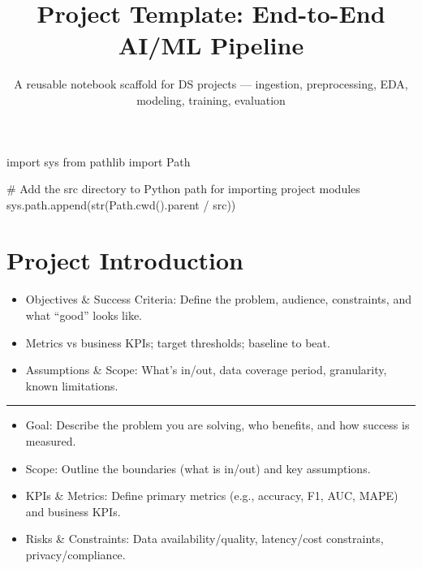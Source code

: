 \documentclass[
  letterpaper,
  DIV=11,
  numbers=noendperiod]{scrartcl}
\title{Project Template: End-to-End AI/ML Pipeline}
\subtitle{A reusable notebook scaffold for DS projects --- ingestion,
preprocessing, EDA, modeling, training, evaluation}
\author{}
\date{}
\newenvironment{Shaded}{\begin{snugshade}}{\end{snugshade}}
\newcommand{\BuiltInTok}[1]{\textcolor[rgb]{0.00,0.23,0.31}{#1}}
\newcommand{\CommentTok}[1]{\textcolor[rgb]{0.37,0.37,0.37}{#1}}
\newcommand{\ImportTok}[1]{\textcolor[rgb]{0.00,0.46,0.62}{#1}}
\newcommand{\NormalTok}[1]{\textcolor[rgb]{0.00,0.23,0.31}{#1}}
\newcommand{\OperatorTok}[1]{\textcolor[rgb]{0.37,0.37,0.37}{#1}}
\newcommand{\StringTok}[1]{\textcolor[rgb]{0.13,0.47,0.30}{#1}}
\providecommand{\tightlist}{%
  \setlength{\itemsep}{0pt}\setlength{\parskip}{0pt}}
\renewenvironment{Shaded}{%
  \begin{tcolorbox}[%
    enhanced,%
    colback=codebg,%
    colframe=codebg,%
    borderline west={3pt}{0pt}{sectionblue},%
    boxrule=0pt,%
    arc=0pt,%
    boxsep=5pt,%
    left=2mm,%
    right=2mm,%
    top=2mm,%
    bottom=2mm%
  ]%
}{%
  \end{tcolorbox}%
}
\renewcommand*\contentsname{Table of contents}
\newcommand\contentsname{Table of contents}
\begin{document}
\maketitle

\renewcommand*\contentsname{Table of contents}
{
\hypersetup{linkcolor=}
\setcounter{tocdepth}{3}
\tableofcontents
}

\begin{Shaded}
\begin{Highlighting}[]
\ImportTok{import}\NormalTok{ sys}
\ImportTok{from}\NormalTok{ pathlib }\ImportTok{import}\NormalTok{ Path}

\CommentTok{\# Add the src directory to Python path for importing project modules}
\NormalTok{sys.path.append(}\BuiltInTok{str}\NormalTok{(Path.cwd().parent }\OperatorTok{/} \StringTok{\textquotesingle{}src\textquotesingle{}}\NormalTok{))}
\end{Highlighting}
\end{Shaded}

\section{Project Introduction}\label{project-introduction}

\begin{itemize}
\tightlist
\item
  Objectives \& Success Criteria: Define the problem, audience,
  constraints, and what ``good'' looks like.
\item
  Metrics vs business KPIs; target thresholds; baseline to beat.
\item
  Assumptions \& Scope: What's in/out, data coverage period,
  granularity, known limitations.
\end{itemize}

\begin{center}\rule{0.5\linewidth}{0.5pt}\end{center}

\begin{itemize}
\tightlist
\item
  Goal: Describe the problem you are solving, who benefits, and how
  success is measured.
\item
  Scope: Outline the boundaries (what is in/out) and key assumptions.
\item
  KPIs \& Metrics: Define primary metrics (e.g., accuracy, F1, AUC,
  MAPE) and business KPIs.
\item
  Risks \& Constraints: Data availability/quality, latency/cost
  constraints, privacy/compliance.
\end{itemize}
\end{document}
